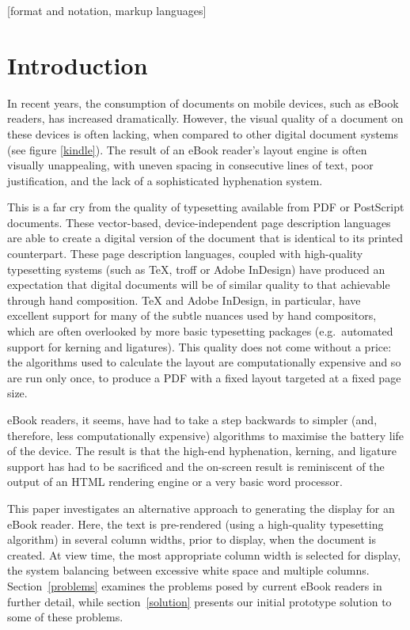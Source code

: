 \documentclass{sig-alternate}
\begin{document}
[format and notation, markup languages]

\section{Introduction}
In recent years, the consumption of documents on mobile devices, such as eBook readers, has increased dramatically. However, the visual quality of a document on these devices is often lacking, when compared to other digital document systems (see figure \ref{kindle}). The result of an eBook reader's layout engine is often visually unappealing, with uneven spacing in consecutive lines of text, poor justification, and the lack of a sophisticated hyphenation system.

This is a far cry from the quality of typesetting available from PDF or PostScript documents. These vector-based, de\-vice-in\-de\-pen\-d\-ent page description languages are able to create a digital version of the document that is identical to its printed counterpart. These page description languages, coupled with high-quality typesetting systems (such as \TeX{}, troff or Adobe InDesign) have produced an expectation that digital documents will be of similar quality to that achievable through hand composition. \TeX{} and Adobe InDesign, in particular, have excellent support for many of the subtle nuances used by hand compositors, which are often overlooked by more basic typesetting packages (e.g.~automated support for kerning and ligatures). This quality does not come without a price: the algorithms used to calculate the layout are computationally expensive and so are run only once, to produce a PDF with a fixed layout targeted at a fixed page size.

eBook readers, it seems, have had to take a step backwards to simpler (and, therefore, less computationally expensive) algorithms to maximise the battery life of the device. The result is that the high-end hyphenation, kerning, and ligature support has had to be sacrificed and the on-screen result is reminiscent of the output of an HTML rendering engine or a very basic word processor.

This paper investigates an alternative approach to generating the display for an eBook reader. Here, the text is pre-rendered (using a high-quality typesetting algorithm) in several column widths, prior to display, when the document is created. At view time, the most appropriate column width is selected for display, the system balancing between excessive white space and multiple columns. Section~\ref{problems} examines the problems posed by current eBook readers in further detail, while section~\ref{solution} presents our initial prototype solution to some of these problems.
\end{document}

